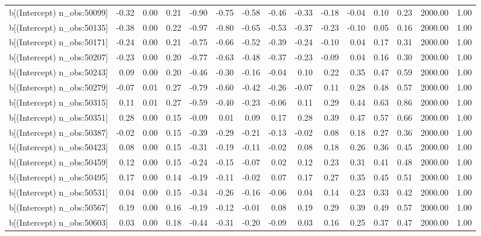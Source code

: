 \begin{table}[ht]
\begin{tabular}{rrrrrrrrrrrrrrr}
  b[(Intercept) n\_obs:50099] & -0.32 & 0.00 & 0.21 & -0.90 & -0.75 & -0.58 & -0.46 & -0.33 & -0.18 & -0.04 & 0.10 & 0.23 & 2000.00 & 1.00 \\ 
  b[(Intercept) n\_obs:50135] & -0.38 & 0.00 & 0.22 & -0.97 & -0.80 & -0.65 & -0.53 & -0.37 & -0.23 & -0.10 & 0.05 & 0.16 & 2000.00 & 1.00 \\ 
  b[(Intercept) n\_obs:50171] & -0.24 & 0.00 & 0.21 & -0.75 & -0.66 & -0.52 & -0.39 & -0.24 & -0.10 & 0.04 & 0.17 & 0.31 & 2000.00 & 1.00 \\ 
  b[(Intercept) n\_obs:50207] & -0.23 & 0.00 & 0.20 & -0.77 & -0.63 & -0.48 & -0.37 & -0.23 & -0.09 & 0.04 & 0.16 & 0.30 & 2000.00 & 1.00 \\ 
  b[(Intercept) n\_obs:50243] & 0.09 & 0.00 & 0.20 & -0.46 & -0.30 & -0.16 & -0.04 & 0.10 & 0.22 & 0.35 & 0.47 & 0.59 & 2000.00 & 1.00 \\ 
  b[(Intercept) n\_obs:50279] & -0.07 & 0.01 & 0.27 & -0.79 & -0.60 & -0.42 & -0.26 & -0.07 & 0.11 & 0.28 & 0.48 & 0.57 & 2000.00 & 1.00 \\ 
  b[(Intercept) n\_obs:50315] & 0.11 & 0.01 & 0.27 & -0.59 & -0.40 & -0.23 & -0.06 & 0.11 & 0.29 & 0.44 & 0.63 & 0.86 & 2000.00 & 1.00 \\ 
  b[(Intercept) n\_obs:50351] & 0.28 & 0.00 & 0.15 & -0.09 & 0.01 & 0.09 & 0.17 & 0.28 & 0.39 & 0.47 & 0.57 & 0.66 & 2000.00 & 1.00 \\ 
  b[(Intercept) n\_obs:50387] & -0.02 & 0.00 & 0.15 & -0.39 & -0.29 & -0.21 & -0.13 & -0.02 & 0.08 & 0.18 & 0.27 & 0.36 & 2000.00 & 1.00 \\ 
  b[(Intercept) n\_obs:50423] & 0.08 & 0.00 & 0.15 & -0.31 & -0.19 & -0.11 & -0.02 & 0.08 & 0.18 & 0.26 & 0.36 & 0.45 & 2000.00 & 1.00 \\ 
  b[(Intercept) n\_obs:50459] & 0.12 & 0.00 & 0.15 & -0.24 & -0.15 & -0.07 & 0.02 & 0.12 & 0.23 & 0.31 & 0.41 & 0.48 & 2000.00 & 1.00 \\ 
  b[(Intercept) n\_obs:50495] & 0.17 & 0.00 & 0.14 & -0.19 & -0.11 & -0.02 & 0.07 & 0.17 & 0.27 & 0.35 & 0.45 & 0.51 & 2000.00 & 1.00 \\ 
  b[(Intercept) n\_obs:50531] & 0.04 & 0.00 & 0.15 & -0.34 & -0.26 & -0.16 & -0.06 & 0.04 & 0.14 & 0.23 & 0.33 & 0.42 & 2000.00 & 1.00 \\ 
  b[(Intercept) n\_obs:50567] & 0.19 & 0.00 & 0.16 & -0.19 & -0.12 & -0.01 & 0.08 & 0.19 & 0.29 & 0.39 & 0.49 & 0.57 & 2000.00 & 1.00 \\ 
  b[(Intercept) n\_obs:50603] & 0.03 & 0.00 & 0.18 & -0.44 & -0.31 & -0.20 & -0.09 & 0.03 & 0.16 & 0.25 & 0.37 & 0.47 & 2000.00 & 1.00 \\ 

\end{tabular}
\end{table}
